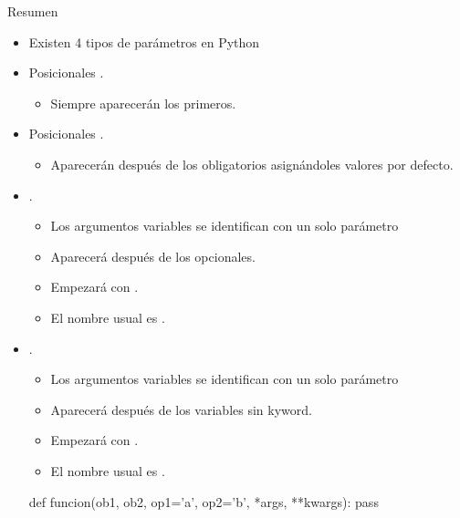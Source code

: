 \documentclass[10pt,envcountsect,spanish]{beamer}
\begin{document}
\begin{frame}[fragile]{Resumen}

\begin{itemize}
\item Existen 4 tipos de parámetros en Python
\item Posicionales . 
	\begin{itemize}
	\item Siempre aparecerán los primeros.
	\end{itemize}
\item Posicionales . 
	\begin{itemize}
	\item Aparecerán después de los obligatorios asignándoles valores por defecto.
	\end{itemize}
\item {}. 
	\begin{itemize}
	\item Los argumentos variables se identifican con un solo parámetro
	\item Aparecerá después de los opcionales.
	\item Empezará con  \cm{*}. 
	\item El nombre usual es  . 
	\end{itemize}
\item {}. 
	\begin{itemize}
	\item Los argumentos variables se identifican con un solo parámetro
	\item Aparecerá después de los variables sin kyword.
	\item Empezará con  \cm{**}. 
	\item El nombre usual es  . 
	\end{itemize}

\unEjemplo
\begin{pyverbatim}[][frame=single]
def funcion(ob1, ob2, op1='a', op2='b', *args, **kwargs):
    pass
\end{pyverbatim}

\end{itemize}
\end{frame}
\end{document}
